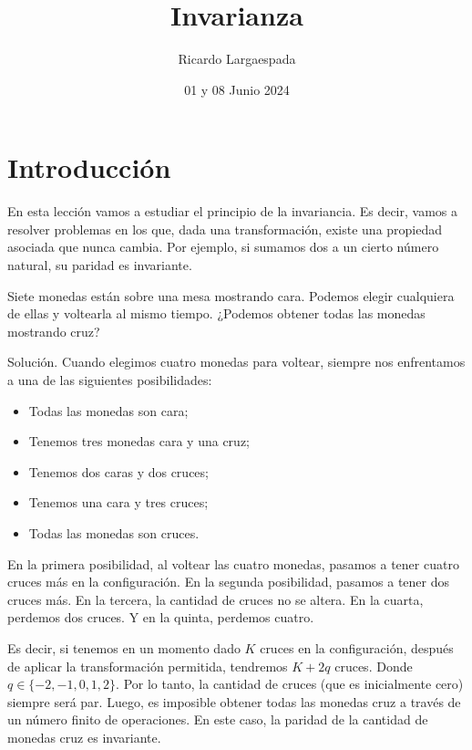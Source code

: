 \documentclass[11pt]{scrartcl}
\begin{document}
\title{Invarianza}
\author{Ricardo Largaespada}
\date{01 y 08 Junio 2024}

\maketitle
\section{Introducción}
En esta lección vamos a estudiar el principio de la invariancia. Es decir, vamos a resolver problemas en los que, dada una transformación, existe una propiedad asociada que nunca cambia. Por ejemplo, si sumamos dos a un cierto número natural, su paridad es invariante.

\begin{example}
Siete monedas están sobre una mesa mostrando cara. Podemos elegir cualquiera de ellas y voltearla al mismo tiempo. ¿Podemos obtener todas las monedas mostrando cruz?
\end{example}
Solución. Cuando elegimos cuatro monedas para voltear, siempre nos enfrentamos a una de las siguientes posibilidades:
\begin{itemize}
    \item Todas las monedas son cara;
    \item Tenemos tres monedas cara y una cruz;
    \item Tenemos dos caras y dos cruces;
    \item Tenemos una cara y tres cruces;
    \item Todas las monedas son cruces.
\end{itemize}

En la primera posibilidad, al voltear las cuatro monedas, pasamos a tener cuatro cruces más en la configuración. En la segunda posibilidad, pasamos a tener dos cruces más. En la tercera, la cantidad de cruces no se altera. En la cuarta, perdemos dos cruces. Y en la quinta, perdemos cuatro.

Es decir, si tenemos en un momento dado \( K \) cruces en la configuración, después de aplicar la transformación permitida, tendremos \( K + 2q \) cruces. Donde \( q \in \{-2, -1, 0, 1, 2\} \). Por lo tanto, la cantidad de cruces (que es inicialmente cero) siempre será par. Luego, es imposible obtener todas las monedas cruz a través de un número finito de operaciones. En este caso, la paridad de la cantidad de monedas cruz es invariante.
\end{document}
